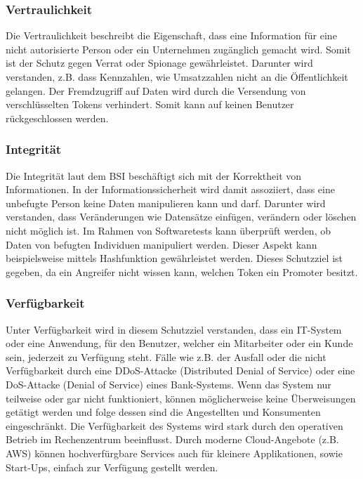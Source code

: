 \subsubsection{Vertraulichkeit}
Die Vertraulichkeit beschreibt die Eigenschaft, dass eine Information für eine nicht autorisierte Person oder ein Unternehmen zugänglich gemacht wird. Somit ist der Schutz gegen Verrat oder Spionage gewährleistet. Darunter wird verstanden, z.B. dass Kennzahlen, wie Umsatzzahlen nicht an die Öffentlichkeit gelangen. 
Der Fremdzugriff auf Daten wird durch die Versendung von verschlüsselten Tokens verhindert. Somit kann auf keinen Benutzer rückgeschlossen werden.

\subsubsection{Integrität}
Die Integrität laut dem BSI beschäftigt sich mit der Korrektheit von Informationen. In der Informationssicherheit wird damit assoziiert, dass eine unbefugte Person keine Daten manipulieren kann und darf. Darunter wird verstanden, dass Veränderungen wie Datensätze einfügen, verändern oder löschen nicht möglich ist.
Im Rahmen von Softwaretests kann überprüft werden, ob Daten von befugten Individuen manipuliert werden. Dieser Aspekt kann beispielsweise mittels Hashfunktion gewährleistet werden.
Dieses Schutzziel ist gegeben, da ein Angreifer nicht wissen kann, welchen Token ein Promoter besitzt.

\subsubsection{Verfügbarkeit}
Unter Verfügbarkeit wird in diesem Schutzziel verstanden, dass ein IT-System oder eine Anwendung, für den Benutzer, welcher ein Mitarbeiter oder ein Kunde sein, jederzeit zu Verfügung steht. Fälle wie z.B. der Ausfall oder die nicht Verfügbarkeit durch eine DDoS-Attacke (Distributed Denial of Service) oder eine DoS-Attacke (Denial of Service) eines Bank-Systems. Wenn das System nur teilweise oder gar nicht funktioniert, können möglicherweise keine Überweisungen getätigt werden und folge dessen sind die Angestellten und Konsumenten eingeschränkt. 
Die Verfügbarkeit des Systems wird stark durch den operativen Betrieb im Rechenzentrum beeinflusst. Durch moderne Cloud-Angebote (z.B. AWS) können hochverfürgbare Services auch für kleinere Applikationen, sowie Start-Ups, einfach zur Verfügung gestellt werden.

